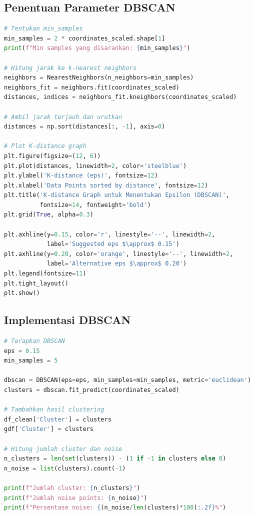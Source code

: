 \documentclass[12pt,a4paper]{article}
\begin{document}
\subsection{Penentuan Parameter DBSCAN}

\begin{lstlisting}[language=Python, caption=K-Distance Graph untuk Menentukan Epsilon]
# Tentukan min_samples
min_samples = 2 * coordinates_scaled.shape[1]
print(f"Min samples yang disarankan: {min_samples}")

# Hitung jarak ke k-nearest neighbors
neighbors = NearestNeighbors(n_neighbors=min_samples)
neighbors_fit = neighbors.fit(coordinates_scaled)
distances, indices = neighbors_fit.kneighbors(coordinates_scaled)

# Ambil jarak terjauh dan urutkan
distances = np.sort(distances[:, -1], axis=0)

# Plot K-distance graph
plt.figure(figsize=(12, 6))
plt.plot(distances, linewidth=2, color='steelblue')
plt.ylabel('K-distance (eps)', fontsize=12)
plt.xlabel('Data Points sorted by distance', fontsize=12)
plt.title('K-distance Graph untuk Menentukan Epsilon (DBSCAN)', 
          fontsize=14, fontweight='bold')
plt.grid(True, alpha=0.3)

plt.axhline(y=0.15, color='r', linestyle='--', linewidth=2, 
            label='Suggested eps $\approx$ 0.15')
plt.axhline(y=0.20, color='orange', linestyle='--', linewidth=2, 
            label='Alternative eps $\approx$ 0.20')
plt.legend(fontsize=11)
plt.tight_layout()
plt.show()
\end{lstlisting}

\subsection{Implementasi DBSCAN}

\begin{lstlisting}[language=Python, caption=Clustering dengan DBSCAN]
# Terapkan DBSCAN
eps = 0.15
min_samples = 5

dbscan = DBSCAN(eps=eps, min_samples=min_samples, metric='euclidean')
clusters = dbscan.fit_predict(coordinates_scaled)

# Tambahkan hasil clustering
df_clean['Cluster'] = clusters
gdf['Cluster'] = clusters

# Hitung jumlah cluster dan noise
n_clusters = len(set(clusters)) - (1 if -1 in clusters else 0)
n_noise = list(clusters).count(-1)

print(f"Jumlah cluster: {n_clusters}")
print(f"Jumlah noise points: {n_noise}")
print(f"Persentase noise: {(n_noise/len(clusters)*100):.2f}%")
\end{lstlisting}
\end{document}
